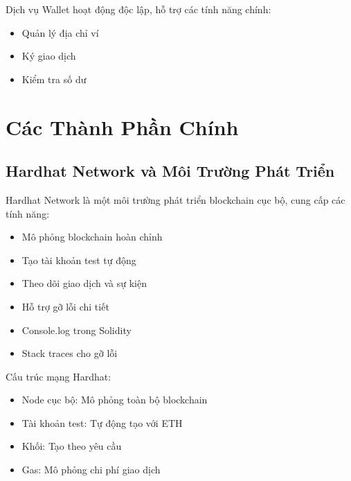 Dịch vụ Wallet hoạt động độc lập, hỗ trợ các tính năng chính:
\begin{itemize}
    \item Quản lý địa chỉ ví
    \item Ký giao dịch
    \item Kiểm tra số dư
\end{itemize}

\section{Các Thành Phần Chính}

\subsection{Hardhat Network và Môi Trường Phát Triển}
Hardhat Network là một môi trường phát triển blockchain cục bộ, cung cấp các tính năng:
\begin{itemize}
    \item Mô phỏng blockchain hoàn chỉnh
    \item Tạo tài khoản test tự động
    \item Theo dõi giao dịch và sự kiện
    \item Hỗ trợ gỡ lỗi chi tiết
    \item Console.log trong Solidity
    \item Stack traces cho gỡ lỗi
\end{itemize}
Cấu trúc mạng Hardhat:
\begin{itemize}
    \item Node cục bộ: Mô phỏng toàn bộ blockchain
    \item Tài khoản test: Tự động tạo với ETH
    \item Khối: Tạo theo yêu cầu
    \item Gas: Mô phỏng chi phí giao dịch
\end{itemize}

